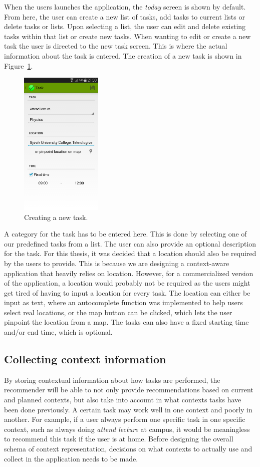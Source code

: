When the users launches the application, the \emph{today} screen is shown by default. From here, the user can create a new list of tasks, add tasks to current lists or delete tasks or lists. Upon selecting a list, the user can edit and delete existing tasks within that list or create new tasks. When wanting to edit or create a new task the user is directed to the new task screen. This is where the actual information about the task is entered. The creation of a new task is shown in Figure~\ref{fig:newtask}.
\begin{figure}[tbp]
  \centering
  \includegraphics[width=0.35\textwidth]{figures/NewTask.png}
  \caption[Screen for creating a new task]{Creating a new task.}
  \label{fig:newtask}
\end{figure}
A category for the task has to be entered here. This is done by selecting one of our predefined tasks from a list. The user can also provide an optional description for the task. For this thesis, it was decided that a location should also be required by the users to provide. This is because we are designing a context-aware application that heavily relies on location. However, for a commercialized version of the application, a location would probably not be required as the users might get tired of having to input a location for every task. The location can either be input as text, where an autocomplete function was implemented to help users select real locations, or the map button can be clicked, which lets the user pinpoint the location from a map. The tasks can also have a fixed starting time and/or end time, which is optional.

\subsection{Collecting context information}
By storing contextual information about how tasks are performed, the recommender will be able to not only provide recommendations based on current and planned contexts, but also take into account in what contexts tasks have been done previously. A certain task may work well in one context and poorly in another. For example, if a user always perform one specific task in one specific context, such as always doing \emph{attend lecture} at campus, it would be meaningless to recommend this task if the user is at home. Before designing the overall schema of context representation, decisions on what contexts to actually use and collect in the application needs to be made. 

